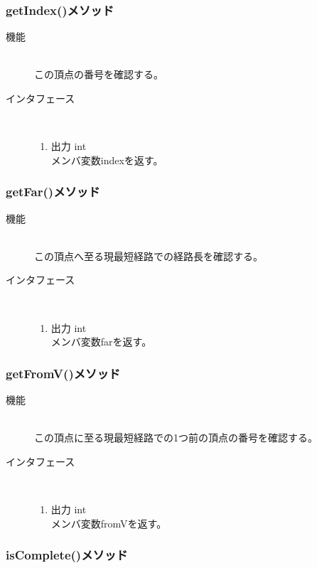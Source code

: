 \documentclass[a4j]{jarticle}
\begin{document}
\begin{description}
\begin{description}
\subsubsection{getIndex()メソッド}

\begin{description}
\item[機能]\mbox{}\\
この頂点の番号を確認する。
\item[インタフェース]\
  \begin{enumerate}
  \item 出力 int\mbox{}\\
    メンバ変数indexを返す。
  \end{enumerate}
\end{description}

\subsubsection{getFar()メソッド}

\begin{description}
\item[機能]\mbox{}\\
この頂点へ至る現最短経路での経路長を確認する。
\item[インタフェース]\
  \begin{enumerate}
  \item 出力 int\mbox{}\\
    メンバ変数farを返す。
  \end{enumerate}
\end{description}

\subsubsection{getFromV()メソッド}

\begin{description}
\item[機能]\mbox{}\\
この頂点に至る現最短経路での1つ前の頂点の番号を確認する。
\item[インタフェース]\
  \begin{enumerate}
  \item 出力 int\mbox{}\\
    メンバ変数fromVを返す。
  \end{enumerate}
\end{description}

\subsubsection{isComplete()メソッド}


\end{description}
\end{description}
\end{document}
